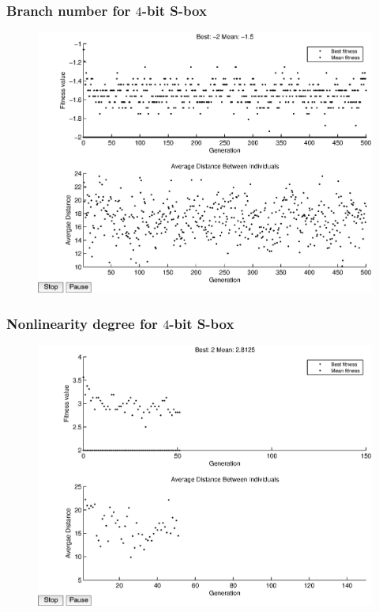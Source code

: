 \documentclass[handout]{beamer}
\begin{document}
\begin{frame}
	\frametitle{Branch number for $4$-bit S-box}
\begin{figure}
	\centering
	\includegraphics[scale=0.5]{images/bn_results16.eps} 
\end{figure}
\end{frame}

\begin{frame}
	\frametitle{Nonlinearity degree for $4$-bit S-box}
\begin{figure}
	\centering
	\includegraphics[scale=0.5]{images/nl_results16.eps} 
\end{figure}
\end{frame}
\end{document}
